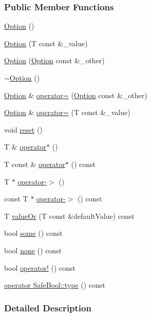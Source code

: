 \subsubsection*{Public Member Functions}
\begin{DoxyCompactItemize}
\item 
\hyperlink{a00063_a8efb01b593d798decc80cbbdf311f2a3}{Option} ()
\item 
\hyperlink{a00063_a5aeb9c22d48a6882bdf5fb4730b06c86}{Option} (T const \&\+\_\+value)
\item 
\hyperlink{a00063_af02f2e4559f06384baec0def8c68c5fd}{Option} (\hyperlink{a00063}{Option} const \&\+\_\+other)
\item 
\hyperlink{a00063_a37fe90bb47bb909f150a5ad6be25581a}{$\sim$\+Option} ()
\item 
\hyperlink{a00063}{Option} \& \hyperlink{a00063_a78c65b15dd6b2fbd04c5012c43017c8f}{operator=} (\hyperlink{a00063}{Option} const \&\+\_\+other)
\item 
\hyperlink{a00063}{Option} \& \hyperlink{a00063_a2be7e343ab22d6061726d32ab4622653}{operator=} (T const \&\+\_\+value)
\item 
void \hyperlink{a00063_a37b4e0e5d4d56296adacd267a616f4e0}{reset} ()
\item 
T \& \hyperlink{a00063_afd989852fa453731c3190dac63caccb0}{operator$\ast$} ()
\item 
T const \& \hyperlink{a00063_a0f05708905dc6b0b470fb24f5d265631}{operator$\ast$} () const 
\item 
T $\ast$ \hyperlink{a00063_acad340798a16c8f700f8763119e90f31}{operator-\/$>$} ()
\item 
const T $\ast$ \hyperlink{a00063_a0800340b2971748671b88acfb14bb928}{operator-\/$>$} () const 
\item 
T \hyperlink{a00063_a21b5629a7febbe3e23c475c9d9138a2d}{value\+Or} (T const \&default\+Value) const 
\item 
bool \hyperlink{a00063_affa96f15798b4656fb753ff52d12dec2}{some} () const 
\item 
bool \hyperlink{a00063_a389324d2aa20ceb0eb0f48a5f77c20c8}{none} () const 
\item 
bool \hyperlink{a00063_a47a1b6f6def2730ea9d27a1860a4f97f}{operator!} () const 
\item 
\hyperlink{a00063_a637d4366ae7f0ded52ce59c8cb06da7b}{operator Safe\+Bool\+::type} () const 
\end{DoxyCompactItemize}


\subsubsection{Detailed Description}
